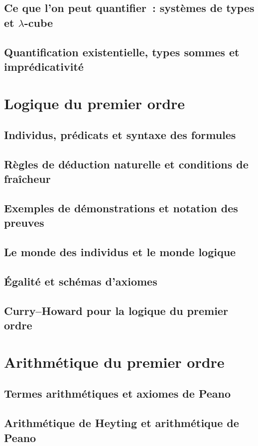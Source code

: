 \subsection{Ce que l'on peut quantifier : systèmes de types et $\lambda$-cube}
\subsection{Quantification existentielle, types sommes et imprédicativité}

\section{Logique du premier ordre}
\subsection{Individus, prédicats et syntaxe des formules}
\subsection{Règles de déduction naturelle et conditions de fraîcheur}
\subsection{Exemples de démonstrations et notation des preuves}
\subsection{Le monde des individus et le monde logique}
\subsection{Égalité et schémas d'axiomes}
\subsection{Curry--Howard pour la logique du premier ordre}

\section{Arithmétique du premier ordre}
\subsection{Termes arithmétiques et axiomes de Peano}
\subsection{Arithmétique de Heyting et arithmétique de Peano}
